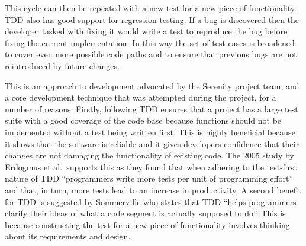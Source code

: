 This cycle can then be repeated with a new test for a new piece of functionality.
TDD also has good support for regression testing. If a bug is discovered then the developer
tasked with fixing it would write a test to reproduce the bug before fixing the current
implementation. In this way the set of test cases is broadened to cover even more
possible code paths and to ensure that previous bugs are not reintroduced by future
changes.

This is an approach to development advocated by the Serenity project team, and a core
development technique that was attempted during the project,
for a number of reasons. Firstly, following TDD ensures that a project has a large
test suite with a good coverage of the code base because functions should not be
implemented without a test being written first. This is highly beneficial because
it shows that the software is reliable and it gives developers confidence that their
changes are not damaging the functionality of existing code. The 2005 study by
Erdogmus et al.\ supports this as they found that when adhering to the test-first
nature of TDD ``programmers write more tests per unit of programming effort'' and
that, in turn, more tests lead to an increase in productivity.\cite{erdogmus2005}
A second benefit for TDD is suggested by Sommerville who states that TDD ``helps
programmers clarify their ideas of what a code segment is actually supposed to
do''. This is because constructing the test for
a new piece of functionality involves thinking about its requirements and design.




